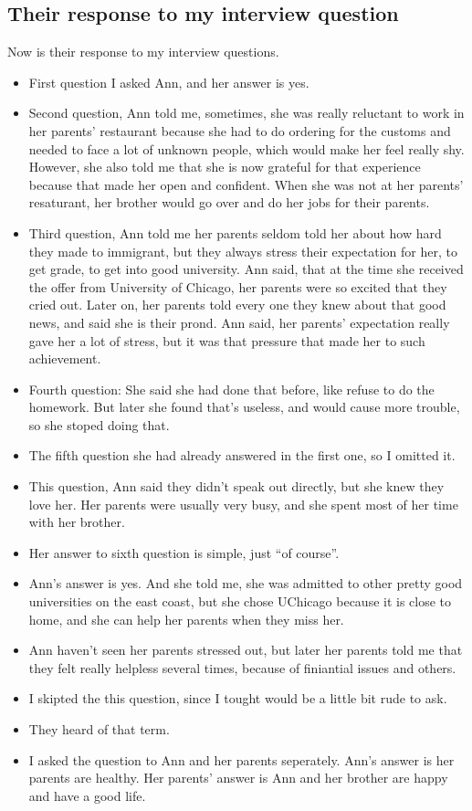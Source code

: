 \subsection{Their response to my interview question}
Now is their response to my interview questions.
\begin{itemize}
  \item First question I asked Ann, and her answer is yes.
  \item Second question, Ann told me, sometimes, she was really reluctant to
  work in her parents' restaurant because she had to do ordering for the
  customs and needed to face a lot of unknown people, which would make her feel
  really shy. However, she also told me that she is now grateful for that 
  experience because that made her open and confident. When she was not at her
  parents' resaturant, her brother would go over and do her jobs for their
  parents.
  \item Third question, Ann told me her parents seldom told her about how hard
  they made to immigrant, but they always stress their expectation for her, to
  get grade, to get into good university. Ann said, that at the time she
  received the offer from University of Chicago, her parents were so excited
  that they cried out. Later on, her parents told every one they knew about that
  good news, and said she is their prond. Ann said, her parents' expectation
  really gave her a lot of stress, but it was that pressure that made her to
  such achievement.
  \item Fourth question: She said she had done that before, like refuse to do
  the homework. But later she found that's useless, and would cause more
  trouble, so she stoped doing that.
  \item The fifth question she had already answered in the first one, so I
  omitted it.
  \item This question, Ann said they didn't speak out directly, but she knew
  they love her. Her parents were usually very busy, and she spent most of her
  time with her brother.
  \item Her answer to sixth question is simple, just ``of course''.
  \item Ann's answer is yes. And she told me, she was admitted to other pretty
  good universities on the east coast, but she chose UChicago because it is
  close to home, and she can help her parents when they miss her.
  \item Ann haven't seen her parents stressed out, but later her parents told me
  that they felt really helpless several times, because of finiantial issues and
  others.
  \item I skipted the this question, since I tought would be a little bit rude
  to ask.
  \item They heard of that term.
  \item I asked the question to Ann and her parents seperately. Ann's answer is
  her parents are healthy. Her parents' answer is Ann and her brother
  are happy and have a good life.
\end{itemize}